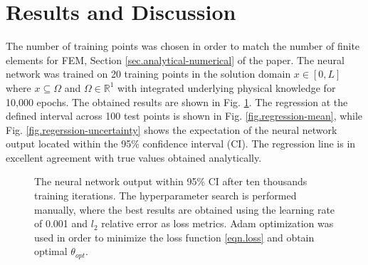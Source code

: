 \documentclass[conference]{IEEEtran}
\begin{document}
\section{Results and Discussion}
\label{sec.results}
The number of training points was chosen in order to match the number of finite elements for FEM, Section \ref{sec.analytical-numerical} of the paper.
The neural network was trained on 20 training points in the solution domain $x \in [0, L]$ where $x \subseteq \Omega$ and $\Omega \in \mathbb R ^1$ with integrated underlying physical knowledge for 10,000 epochs. The obtained results are shown in Fig. \ref{fig.regression}. The regression at the defined interval across 100 test points is shown in Fig. \ref{fig.regression-mean}, while Fig. \ref{fig.regerssion-uncertainty} shows the expectation of the neural network output located within the 95\% confidence interval (CI). The regression line is in excellent agreement with true values obtained analytically. 
\begin{figure}[!t]
\centering
{}
\hfil
{}
\caption{The neural network output within 95\% CI after ten thousands training iterations. The hyperparameter search is performed manually, where the best results are obtained using the learning rate of 0.001 and $l_2$ relative error as loss metrics. Adam optimization was used in order to minimize the loss function \eqref{eqn.loss} and obtain optimal $\theta_{opt}$.}
\label{fig.regression}
\end{figure}
\end{document}
